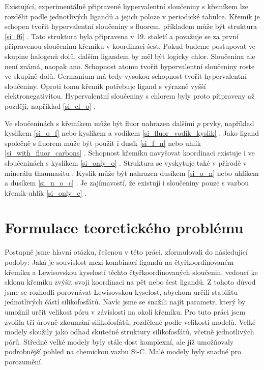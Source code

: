 \documentclass[
  digital, %
  table,   %
  lof,     %
  lot,     %
  oneside,
]{fithesis3}
\begin{document}
Existující, experimentálně připravené hypervalentní sloučeniny s křemíkem lze rozdělit podle jednotlivých ligandů a jejich poloze v periodické tabulce. Křemík je schopen tvořit hypervalentní sloučeniny s fluorem, příkladem může být struktura   \ref{si_f6} \cite{memoriesphysiquelussac}. Tato struktura byla připravena v 19. století a považuje se za první připravenou sloučeninu křemíku v koordinaci šest. Pokud budeme postupovat ve skupine halogenů dolů, dalším ligandem by měl být logicky chlor. Sloučenina  ale není známá, naopak  ano. Schopnost atomu tvořit hypervalentní sloučeniny roste ve skupině dolů. Germanium má tedy vysokou schopnost tvořit hypervalentní sloučeniny. Oproti tomu křemík potřebuje ligand s výrazně vyšší elektronegativitou. Hypervalentní sloučeniny s chlorem byly proto připraveny až později, například \ref{si_cl_o} \cite{LAZAREV199716}.

Ve sloučeninách s křemíkem může být fluor nahrazen dalšími $p$ prvky, například kyslíkem \ref{si_o_f} \cite{C0DT01115K} nebo kyslíkem a vodíkem \ref{si_fluor_vodik_kyslik} \cite{BOYER19812165}.
Jako ligand společně s fluorem může být použit i dusík \ref{si_f_n} \cite{C0DT01115K} nebo uhlík \ref{si_with_fluor_carbons} \cite{kremikfluorcarbon}. Schopnost křemíku navyšovat koordinaci existuje i ve sloučeninách s kyslíkem \ref{si_only_o} \cite{flyn1969}.  Struktura  se vyskytuje také v přírodě v minerálu thaumasitu \cite{Edge:a08100}. Kyslík může být nahrazen dusíkem  \ref{si_o_n} \cite{Wagler2014} nebo uhlíkem a dusíkem  \ref{si_n_o_c} \cite{Wagler2014}. Je zajímavostí, že existují i sloučeniny pouze s vazbou křemík-uhlík \ref{si_only_c} \cite{A901953G} \cite{Wagler2014}.

\section{Formulace teoretického problému}
Postupně jsme hlavní otázku, řešenou v této práci, zformulovali do následující podoby: Jaká je souvislost mezi kombinací ligandů na čtyřkoordinovaném křemíku a Lewisovskou kyselostí těchto čtyřkoordinovaných sloučenin, vedoucí ke sklonu křemíku zvýšit svoji koordinaci na pět nebo šest ligandů.
Z tohoto důvod jsme se rozhodli porovnávat Lewisovskou kyselost, abychom určili stabilitu jednotlivých částí silikofosfátů. Navíc jsme se snažili najít parametr, který by umožnil určit velikost póru v závislosti na okolí křemíku. Pro tuto práci jsem zvolila tři úrovně zkoumání silikofosfátů, rozdělené podle velikosti modelů. Velké modely sloužily jako odhad skutečné struktury silikofosfátů, včetně jednotlivých pórů. Středně velké modely byly stále dost komplexní, ale již umožňovaly podrobnější pohled na chemickou vazbu Si-C. Malé modely byly snadné pro porozumění.
\end{document}
